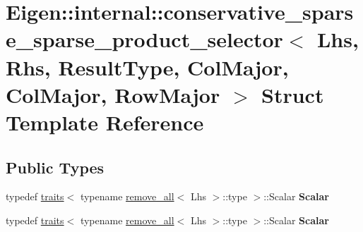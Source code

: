\hypertarget{struct_eigen_1_1internal_1_1conservative__sparse__sparse__product__selector_3_01_lhs_00_01_rhs_0f1680f6d2d45917adac59b754c8465e6}{}\section{Eigen\+:\+:internal\+:\+:conservative\+\_\+sparse\+\_\+sparse\+\_\+product\+\_\+selector$<$ Lhs, Rhs, Result\+Type, Col\+Major, Col\+Major, Row\+Major $>$ Struct Template Reference}
\label{struct_eigen_1_1internal_1_1conservative__sparse__sparse__product__selector_3_01_lhs_00_01_rhs_0f1680f6d2d45917adac59b754c8465e6}
\subsection*{Public Types}
\begin{DoxyCompactItemize}
\item 
\mbox{\label{struct_eigen_1_1internal_1_1conservative__sparse__sparse__product__selector_3_01_lhs_00_01_rhs_0f1680f6d2d45917adac59b754c8465e6_a8e51d4364ddc415e957c749ac5f7dd1c}} 
typedef \hyperlink{struct_eigen_1_1internal_1_1traits}{traits}$<$ typename \hyperlink{struct_eigen_1_1internal_1_1remove__all}{remove\+\_\+all}$<$ Lhs $>$\+::type $>$\+::Scalar {\bfseries Scalar}
\item 
\mbox{\label{struct_eigen_1_1internal_1_1conservative__sparse__sparse__product__selector_3_01_lhs_00_01_rhs_0f1680f6d2d45917adac59b754c8465e6_a8e51d4364ddc415e957c749ac5f7dd1c}} 
typedef \hyperlink{struct_eigen_1_1internal_1_1traits}{traits}$<$ typename \hyperlink{struct_eigen_1_1internal_1_1remove__all}{remove\+\_\+all}$<$ Lhs $>$\+::type $>$\+::Scalar {\bfseries Scalar}
\end{DoxyCompactItemize}
